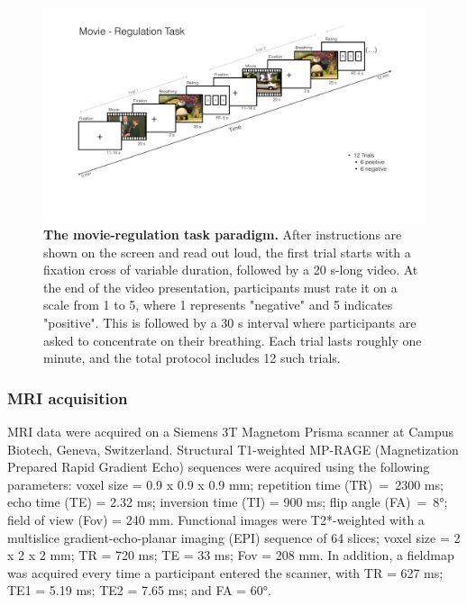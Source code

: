 \begin{figure}[h]
\centering
\includegraphics[width=1\textwidth]{images/Ch5/Ch5_movieRegTask.pdf}
\vspace*{5mm}
\caption{\textbf{The movie-regulation task paradigm. } After instructions are shown on the screen and read out loud, the first trial starts with a fixation cross of variable duration, followed by a 20 s-long video. At the end of the video presentation, participants must rate it on a scale from 1 to 5, where 1 represents "negative" and 5 indicates "positive". This is followed by a 30 s interval where participants are asked to concentrate on their breathing. Each trial lasts roughly one minute, and the total protocol includes 12 such trials.  }
\label{fig:videoReg_task} 
\end{figure}










\subsubsection{MRI acquisition} \label{section:OFC_imgAcquisition}
MRI data were acquired on a Siemens 3T Magnetom Prisma scanner at Campus Biotech, Geneva, Switzerland. Structural T1-weighted MP-RAGE (Magnetization Prepared Rapid Gradient Echo) sequences were acquired using the following parameters: voxel size = 0.9 x 0.9 x 0.9 mm; repetition time (TR)~=~2300 ms; echo time (TE) = 2.32 ms; inversion time (TI) = 900 ms; flip angle (FA)~=~8°; field of view (Fov) = 240 mm. Functional images were T2*-weighted with a multislice gradient-echo-planar imaging (EPI) sequence of 64 slices; voxel size = 2 x 2 x 2 mm; TR = 720 ms; TE = 33 ms; Fov = 208 mm. In addition, a fieldmap was acquired every time a participant entered the scanner, with TR = 627 ms; TE1 = 5.19 ms; TE2 = 7.65 ms; and FA = 60°.

